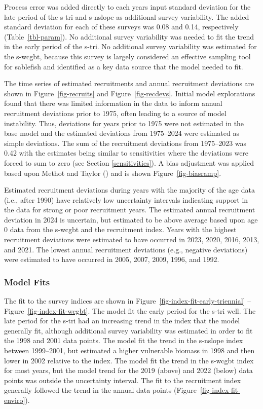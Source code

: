 \documentclass[
  english,
]{article}
\begin{document}
Process error was added directly to each years input standard deviation
for the late period of the \gls{s-tri} and \gls{s-nslope} as additional
survey variability. The added standard deviation for each of these
surveys was 0.08 and 0.14, respectively (Table~\ref{tbl-param}). No
additional survey variability was needed to fit the trend in the early
period of the \gls{s-tri}. No additional survey variability was
estimated for the \gls{s-wcgbt}, because this survey is largely
considered an effective sampling tool for sablefish and identified as a
key data source that the model needed to fit.

The time series of estimated recruitments and annual recruitment
deviations are shown in Figure~\ref{fig-recruits} and
Figure~\ref{fig-recdevs}. Initial model explorations found that there
was limited information in the data to inform annual recruitment
deviations prior to 1975, often leading to a source of model
instability. Thus, deviations for years prior to 1975 were not estimated
in the base model and the estimated deviations from 1975--2024 were
estimated as simple deviations. The sum of the recruitment deviations
from 1975--2023 was 0.42 with the estimates being similar to
sensitivities where the deviations were forced to sum to zero (see
Section \ref{sensitivities}). A bias adjustment was applied based upon
Methot and Taylor () and is
shown Figure~\ref{fig-biasramp}.

Estimated recruitment deviations during years with the majority of the
age data (i.e., after 1990) have relatively low uncertainty intervals
indicating support in the data for strong or poor recruitment years. The
estimated annual recruitment deviation in 2024 is uncertain, but
estimated to be above average based upon age 0 data from the
\gls{s-wcgbt} and the recruitment index. Years with the highest
recruitment deviations were estimated to have occurred in 2023, 2020,
2016, 2013, and 2021. The lowest annual recruitment deviations (e.g.,
negative deviations) were estimated to have occurred in 2005, 2007,
2009, 1996, and 1992.

\subsubsection{Model Fits}\label{model-fits}

The fit to the survey indices are shown in
Figure~\ref{fig-index-fit-early-triennial} --
Figure~\ref{fig-index-fit-wcgbt}. The model fit the early period for the
\gls{s-tri} well. The late period for the \gls{s-tri} had an increasing
trend in the index that the model generally fit, although additional
survey variability was estimated in order to fit the 1998 and 2001 data
points. The model fit the trend in the \gls{s-nslope} index between
1999--2001, but estimated a higher vulnerable biomass in 1998 and then
lower in 2002 relative to the index. The model fit the trend in the
\gls{s-wcgbt} index for most years, but the model trend for the 2019
(above) and 2022 (below) data points was outside the uncertainty
interval. The fit to the recruitment index generally followed the trend
in the annual data points (Figure~\ref{fig-index-fit-enviro}).
\end{document}
